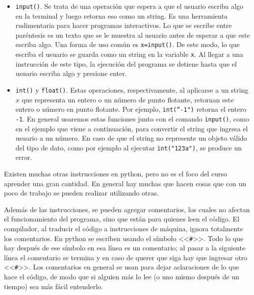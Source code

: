 \documentclass[a4paper, 12pt]{report}
\theoremstyle{definition}
\begin{document}
\begin{itemize}
	\item {\tt input()}. Se trata de una operación que espera a que el usuario escriba algo en la terminal y luego retorna eso como un string. Es una herramienta rudimentaria para hacer programas interactivos. Lo que se escribe entre paréntesis es un texto que se le muestra al usuario antes de esperar a que este escriba algo. Una forma de uso común es  {\tt x=input()}. De este modo, lo que escriba el usuario se guarda como un string en la variable {\tt x}. Al llegar a una instrucción de este tipo, la ejecución del programa se detiene hasta que el usuario escriba algo y presione enter.
	
	\item {\tt int()} y {\tt float()}. Estas operaciones, respectivamente, al aplicarse a un string $x$ que representa un entero o un número de punto flotante, retornan este entero o número en punto flotante. Por ejemplo, {\tt int(``-1")} retorna el entero {\tt -1}. En general usaremos estas funciones junto con el comando {\tt input()}, como en el ejemplo que viene a continuación, para convertir el string que ingresa el usuario a un número. En caso de que el string no represente un objeto válido del tipo de dato, como por ejemplo al ejecutar {\tt int("123a")}, se produce un error.
\end{itemize}

Existen muchas otras instrucciones en python, pero no es el foco del curso aprender una gran cantidad. En general hay muchas que hacen cosas que con un poco de trabajo se pueden realizar utilizando otras.

Además de las instrucciones, se pueden agregar comentarios, los cuales no afectan el funcionamiento del programa, sino que están para quienes leen el código. El compilador, al traducir el código a instrucciones de máquina, ignora totalmente los comentarios. En python se escriben usando el símbolo <<{\tt\#}>>. Todo lo que hay después de ese símbolo en esa línea es un comentario; al pasar a la siguiente línea el comentario se termina y en caso de querer que siga hay que ingresar otro <<{\tt\#}>>. Los comentarios en general se usan para dejar aclaraciones de lo que hace el código, de modo que si alguien más lo lee (o uno mismo después de un tiempo) sea más fácil entenderlo.
\end{document}
